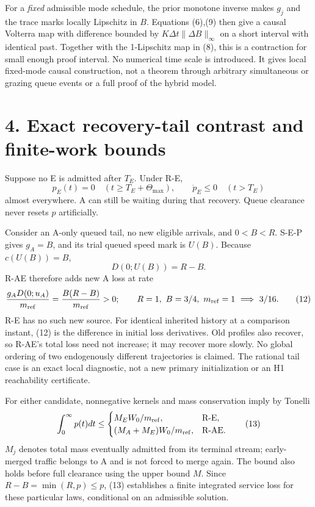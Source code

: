 \documentclass[11pt,a4paper]{article}
\begin{document}
For a \emph{fixed} admissible mode schedule, the prior monotone inverse
makes $g_j$ and the trace marks locally Lipschitz in $B$. Equations
(6),(9) then give a causal Volterra map with difference bounded by
$K\Delta t\|\Delta B\|_\infty$ on a short interval with identical past.
Together with the 1-Lipschitz map in (8), this is a contraction for small
enough proof interval. No numerical time scale is introduced. It gives
local fixed-mode causal construction, not a theorem through arbitrary
simultaneous or grazing queue events or a full proof of the hybrid model.

\newpage
\section*{4. Exact recovery-tail contrast and finite-work bounds}

Suppose no E is admitted after $T_E$. Under R-E,
\begin{equation}
 p_E(t)=0\quad(t\geq T_E+\Theta_{\max}),\qquad
 \dot p_E\leq0\quad(t>T_E) \tag{10}
\end{equation}
almost everywhere. A can still be waiting during that recovery. Queue
clearance never resets $p$ artificially.

Consider an A-only queued tail, no new eligible arrivals, and
$0<B<R$. S-E-P gives $g_A=B$, and its trial queued speed mark is $U(B)$.
Because $c(U(B))=B$,
\begin{equation}
 D(0;U(B))=R-B. \tag{11}
\end{equation}
R-AE therefore adds new A loss at rate
\begin{equation}
 \frac{g_AD(0;u_A)}{m_{\rm ref}}
       =\frac{B(R-B)}{m_{\rm ref}}>0;\qquad
 R=1,\ B=3/4,\ m_{\rm ref}=1\ \Longrightarrow\ 3/16. \tag{12}
\end{equation}
R-E has no such new source. For identical inherited history at a comparison
instant, (12) is the difference in initial loss derivatives. Old profiles
also recover, so R-AE's total loss need not increase; it may recover more
slowly. No global ordering of two endogenously different trajectories is
claimed. The rational tail case is an exact local diagnostic, not a new
primary initialization or an H1 reachability certificate.

For either candidate, nonnegative kernels and mass conservation imply
by Tonelli
\begin{equation}
 \int_0^\infty p(t)dt\leq
 \begin{cases}
 M_EW_0/m_{\rm ref},&\text{R-E},\\
 (M_A+M_E)W_0/m_{\rm ref},&\text{R-AE}.
 \end{cases} \tag{13}
\end{equation}
$M_j$ denotes total mass eventually admitted from its terminal stream;
early-merged traffic belongs to A and is not forced to merge again.
The bound also holds before full clearance using the upper bound $M$.
Since $R-B=\min(R,p)\leq p$, (13) establishes a finite integrated service
loss for these particular laws, conditional on an admissible solution.
\end{document}
